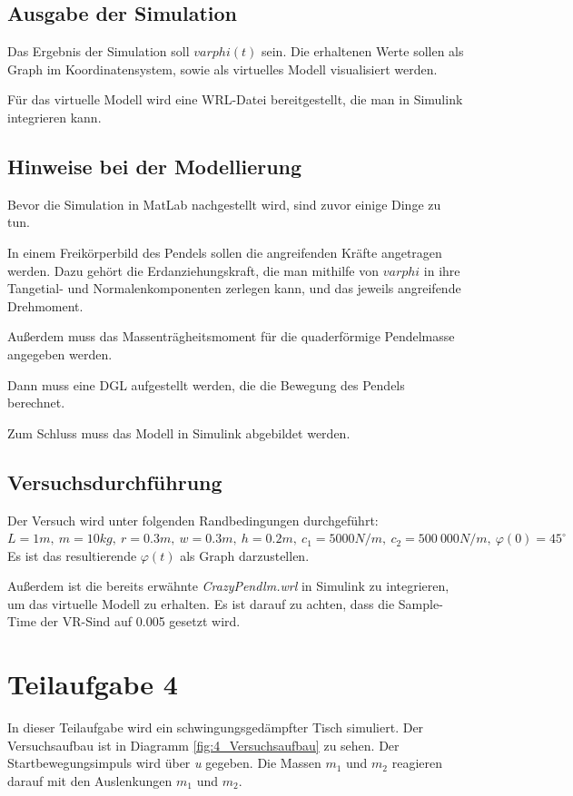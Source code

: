 \documentclass[]{scrartcl}
\begin{document}
\subsection{Ausgabe der Simulation}
Das Ergebnis der Simulation soll $varphi(t)$ sein. Die erhaltenen Werte sollen als Graph im Koordinatensystem, sowie als virtuelles Modell visualisiert werden.

Für das virtuelle Modell wird eine WRL-Datei bereitgestellt, die man in Simulink integrieren kann.

\subsection{Hinweise bei der Modellierung}
Bevor die Simulation in MatLab nachgestellt wird, sind zuvor einige Dinge zu tun.

In einem Freikörperbild des Pendels sollen die angreifenden Kräfte angetragen werden. Dazu gehört die Erdanziehungskraft, die man mithilfe von $varphi$ in ihre Tangetial- und Normalenkomponenten zerlegen kann, und das jeweils angreifende Drehmoment.

Außerdem muss das Massenträgheitsmoment für die quaderförmige Pendelmasse angegeben werden.

Dann muss eine DGL aufgestellt werden, die die Bewegung des Pendels berechnet.

Zum Schluss muss das Modell in Simulink abgebildet werden.

\subsection{Versuchsdurchführung}
Der Versuch wird unter folgenden Randbedingungen durchgeführt: $L=1m,\ m=10kg,\ r=0.3m,\ w=0.3m,\ h=0.2m,\ c_{1}=5000N/m,\ c_{2}=500\ 000N/m,\ \varphi(0)=45^\circ$
Es ist das resultierende $\varphi(t)$ als Graph darzustellen.

Außerdem ist die bereits erwähnte \textit{CrazyPendlm.wrl} in Simulink zu integrieren, um das virtuelle Modell zu erhalten. Es ist darauf zu achten, dass die Sample-Time der VR-Sind auf 0.005 gesetzt wird.

\section{Teilaufgabe 4}
In dieser Teilaufgabe wird ein schwingungsgedämpfter Tisch simuliert. Der Versuchsaufbau ist in Diagramm \ref{fig:4_Versuchsaufbau} zu sehen. Der Startbewegungsimpuls wird über \textit{u} gegeben. Die Massen $m_{1}$ und $m_{2}$ reagieren darauf mit den Auslenkungen $m_{1}$ und $m_{2}$.
\end{document}
